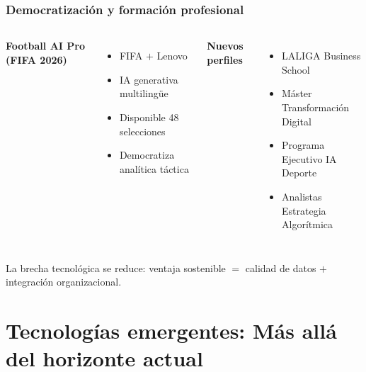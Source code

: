 \documentclass[aspectratio=169]{beamer}
\begin{document}
\begin{frame}\frametitle{Democratización y formación profesional}
\begin{columns}[T]
\textbf{Football AI Pro (FIFA 2026)}
\begin{itemize}
    \item FIFA $+$ Lenovo
    \item IA generativa multilingüe
    \item Disponible 48 selecciones
    \item Democratiza analítica táctica
\end{itemize}

\textbf{Nuevos perfiles}
\begin{itemize}
    \item LALIGA Business School
    \item Máster Transformación Digital
    \item Programa Ejecutivo IA Deporte
    \item Analistas Estrategia Algorítmica
\end{itemize}
\end{columns}
La brecha tecnológica se reduce: ventaja sostenible $=$ calidad de datos $+$ integración organizacional.
\end{frame}

\section{Tecnologías emergentes: Más allá del horizonte actual}
\frame{\sectionpage}
\end{document}
